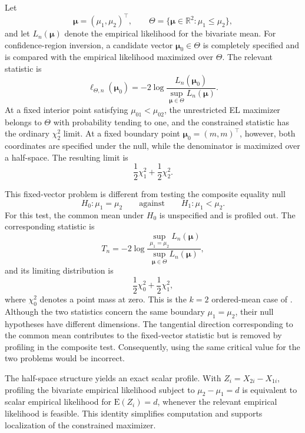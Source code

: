 \documentclass[11pt]{article}
\theoremstyle{remark}
\begin{document}
Let
$$
\boldsymbol{\mu}=(\mu_1,\mu_2)^\top,
\qquad
\Theta=\{\boldsymbol{\mu}\in\mathbb{R}^2:\mu_1\leq\mu_2\},
$$
and let $L_n(\boldsymbol{\mu})$ denote the empirical likelihood for the bivariate mean. For confidence-region inversion, a candidate vector $\boldsymbol{\mu}_0\in\Theta$ is completely specified and is compared with the empirical likelihood maximized over $\Theta$. The relevant statistic is
$$
\ell_{\Theta,n}(\boldsymbol{\mu}_0)
=-2\log
\frac{L_n(\boldsymbol{\mu}_0)}
{\sup_{\boldsymbol{\mu}\in\Theta}L_n(\boldsymbol{\mu})}.
$$
At a fixed interior point satisfying $\mu_{01}<\mu_{02}$, the unrestricted EL maximizer belongs to $\Theta$ with probability tending to one, and the constrained statistic has the ordinary $\chi^2_2$ limit. At a fixed boundary point $\boldsymbol{\mu}_0=(m,m)^\top$, however, both coordinates are specified under the null, while the denominator is maximized over a half-space. The resulting limit is
$$
\frac{1}{2}\chi^2_1+\frac{1}{2}\chi^2_2.
$$

This fixed-vector problem is different from testing the composite equality null
$$
H_0:\mu_1=\mu_2
\qquad\text{against}\qquad
H_1:\mu_1<\mu_2.
$$
For this test, the common mean under $H_0$ is unspecified and is profiled out. The corresponding statistic is
$$
T_n=
-2\log
\frac{\sup_{\mu_1=\mu_2}L_n(\boldsymbol{\mu})}
{\sup_{\boldsymbol{\mu}\in\Theta}L_n(\boldsymbol{\mu})},
$$
and its limiting distribution is
$$
\frac{1}{2}\chi^2_0+\frac{1}{2}\chi^2_1,
$$
where $\chi^2_0$ denotes a point mass at zero. This is the $k=2$ ordered-mean case of \citet[Theorem~3.2 and Example~2]{el1996empirical}. Although the two statistics concern the same boundary $\mu_1=\mu_2$, their null hypotheses have different dimensions. The tangential direction corresponding to the common mean contributes to the fixed-vector statistic but is removed by profiling in the composite test. Consequently, using the same critical value for the two problems would be incorrect.

The half-space structure yields an exact scalar profile. With $Z_i=X_{2i}-X_{1i}$, profiling the bivariate empirical likelihood subject to $\mu_2-\mu_1=d$ is equivalent to scalar empirical likelihood for $\mathrm{E}(Z_i)=d$, whenever the relevant empirical likelihood is feasible. This identity simplifies computation and supports localization of the constrained maximizer.
\end{document}
